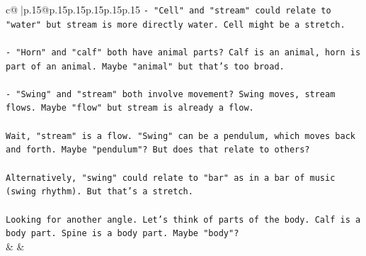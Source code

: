 \documentclass{article}
\begin{document}
{\begin{supertabular}{c@{$\;$}|p{.15\linewidth}@{}p{.15\linewidth}p{.15\linewidth}p{.15\linewidth}p{.15\linewidth}p{.15\linewidth}}
{{{\texttt{{-} "Cell" and "stream" could relate to "water" but stream is more directly water. Cell might be a stretch.} \\
\\ 
\texttt{{-} "Horn" and "calf" both have animal parts? Calf is an animal, horn is part of an animal. Maybe "animal" but that's too broad.} \\
\\ 
\texttt{{-} "Swing" and "stream" both involve movement? Swing moves, stream flows. Maybe "flow" but stream is already a flow.} \\
\\ 
\texttt{Wait, "stream" is a flow. "Swing" can be a pendulum, which moves back and forth. Maybe "pendulum"? But does that relate to others?} \\
\\ 
\texttt{Alternatively, "swing" could relate to "bar" as in a bar of music (swing rhythm). But that's a stretch.} \\
\\ 
\texttt{Looking for another angle. Let's think of parts of the body. Calf is a body part. Spine is a body part. Maybe "body"?} \\
            }
        }
    }
    & & \\ \\


\end{supertabular}}
\end{document}
